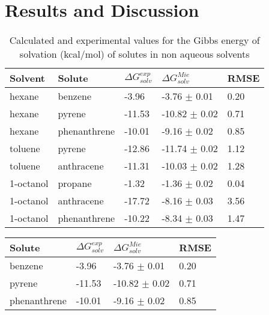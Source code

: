 \chapter{Results and Discussion} %

\label{Chapter5} %

\begin{table*}[h]
\center
  \caption{Calculated and experimental values for the Gibbs energy of solvation (kcal/mol) of solutes in non aqueous solvents}
  \label{tbl:solv1}
  \begin{tabular}{lllll}
    \hline
      Solvent & Solute & $\Delta G_{solv}^{exp}$ & $\Delta G_{solv}^{Mie}$ & RMSE \\
    \hline
    hexane    & benzene      & -3.96  & -3.76  $\pm$ 0.01 & 0.20 \\
    hexane    & pyrene       & -11.53 & -10.82 $\pm$ 0.02 & 0.71 \\
    hexane    & phenanthrene & -10.01 & -9.16  $\pm$ 0.02 & 0.85 \\
    toluene   & pyrene       & -12.86 & -11.74 $\pm$ 0.02 & 1.12\\
    toluene   & anthracene   & -11.31 & -10.03 $\pm$ 0.02 & 1.28\\
    1-octanol & propane      & -1.32  & -1.36  $\pm$ 0.02 & 0.04 \\
    1-octanol & anthracene   & -17.72 & -8.16  $\pm$ 0.03 & 3.56 \\
    1-octanol & phenanthrene & -10.22 & -8.34  $\pm$ 0.03 & 1.47 \\
    \hline
  \end{tabular}

\end{table*}

\begin{table*}[h]
\center
  \label{tbl:solv1tes}
  \begin{tabular}{llll}
    \hline
     Solute & $\Delta G_{solv}^{exp}$ & $\Delta G_{solv}^{Mie}$ & RMSE \\
    \hline
    benzene      & -3.96  & -3.76  $\pm$ 0.01 & 0.20 \\
    pyrene       & -11.53 & -10.82 $\pm$ 0.02 & 0.71 \\
    phenanthrene & -10.01 & -9.16  $\pm$ 0.02 & 0.85 \\
    \hline
  \end{tabular}

\end{table*}

